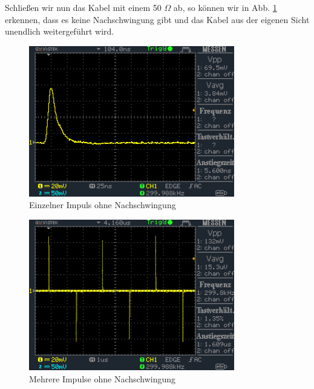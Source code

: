 \documentclass[a4paper,12pt,twocoloumn]{article}
\numberwithin{equation}{section}
\begin{document}
Schließen wir nun das Kabel mit einem 50 $\Omega$ ab, so können wir in Abb. \ref{fig:3.4} erkennen, dass es keine Nachschwingung gibt und das Kabel aus der eigenen Sicht unendlich weitergeführt wird. 
\begin{figure}[h]
        \centering
        \includegraphics[width=0.8\textwidth]{data/DS0019.BMP.png}
        \caption{Einzelner Impuls ohne Nachschwingung}
		\label{fig:3.4}
\end{figure}
\begin{figure}[h]
        \centering
        \includegraphics[width=0.8\textwidth]{data/DS0020.BMP.png}
        \caption{Mehrere Impulse ohne Nachschwingung}
		\label{fig:3.5}
\end{figure}
\end{document}
